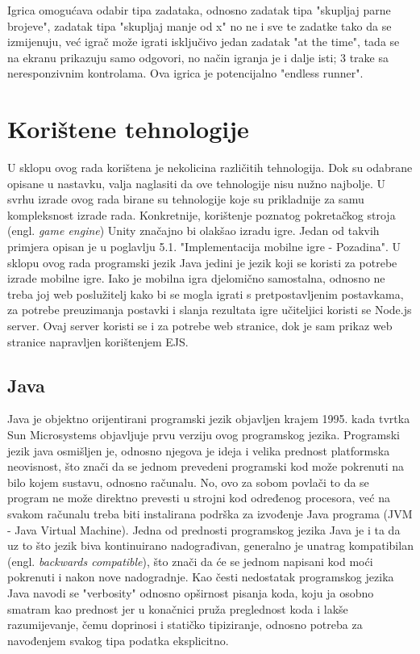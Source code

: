 \documentclass[times, utf8, zavrsni, numeric]{fer}
\begin{document}
Igrica omogućava odabir tipa zadataka, odnosno zadatak tipa "skupljaj parne brojeve", zadatak tipa "skupljaj manje od x" no ne i sve te zadatke tako da se izmijenuju, već igrač može igrati isključivo jedan zadatak "at the time", tada se na ekranu 
prikazuju samo odgovori, no način igranja je i dalje isti; 3 trake sa neresponzivnim kontrolama. Ova igrica je potencijalno "endless runner". 

\chapter{Korištene tehnologije}
U sklopu ovog rada korištena je nekolicina različitih tehnologija. Dok su odabrane opisane u nastavku, valja naglasiti da ove tehnologije nisu nužno najbolje. U svrhu izrade ovog rada birane su tehnologije koje su prikladnije za samu kompleksnost izrade rada.
Konkretnije, korištenje poznatog pokretačkog stroja (engl. \textit{game engine}) Unity značajno bi olakšao izradu igre. Jedan od takvih primjera opisan je u poglavlju 5.1. "Implementacija mobilne igre - Pozadina". 
U sklopu ovog rada programski jezik Java jedini je jezik koji se koristi za potrebe izrade mobilne igre. Iako je mobilna igra djelomično samostalna, odnosno ne treba joj web poslužitelj kako bi se mogla igrati s pretpostavljenim postavkama, za potrebe 
preuzimanja postavki i slanja rezultata igre učiteljici koristi se Node.js server. Ovaj server koristi se i za potrebe web stranice, dok je sam prikaz web stranice napravljen korištenjem EJS.


	\section{Java}
	Java je objektno orijentirani programski jezik objavljen krajem 1995. kada tvrtka Sun Microsystems objavljuje prvu verziju ovog programskog jezika. Programski jezik java osmišljen je, odnosno njegova je ideja i velika prednost platformska neovisnost,
	što znači da se jednom prevedeni programski kod može pokrenuti na bilo kojem sustavu, odnosno računalu. No, ovo za sobom povlači to da se program ne može direktno prevesti u strojni kod određenog procesora, već na svakom računalu treba biti
	instalirana podrška za izvođenje Java programa (JVM - Java Virtual Machine). 
	Jedna od prednosti programskog jezika Java je i ta da uz to što jezik biva kontinuirano nadograđivan, generalno je unatrag kompatibilan (engl. \textit{backwards compatible}), što znači da će se jednom napisani kod moći pokrenuti i nakon nove nadogradnje.
	Kao česti nedostatak programskog jezika Java navodi se "verbosity" odnosno opširnost pisanja koda, koju ja osobno smatram kao prednost jer u konačnici pruža preglednost koda i lakše razumijevanje, čemu doprinosi i statičko tipiziranje, odnosno 
	potreba za navođenjem svakog tipa podatka eksplicitno. 
	
\end{document}
